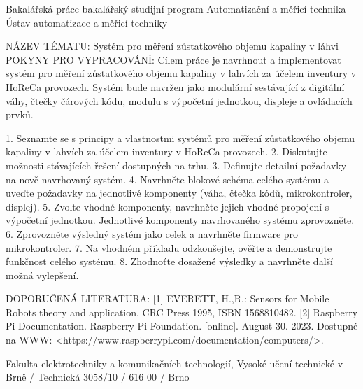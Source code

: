 Bakalářská práce
bakalářský studijní program Automatizační a měřicí technika
Ústav automatizace a měřicí techniky

NÁZEV TÉMATU:
Systém pro měření zůstatkového objemu kapaliny v láhvi
POKYNY PRO VYPRACOVÁNÍ:
Cílem práce je navrhnout a implementovat systém pro měření zůstatkového objemu kapaliny v lahvích za účelem
inventury v HoReCa provozech. Systém bude navržen jako modulární sestávající z digitální váhy, čtečky
čárových kódu, modulu s výpočetní jednotkou, displeje a ovládacích prvků.

1. Seznamte se s principy a vlastnostmi systémů pro měření zůstatkového objemu kapaliny v lahvích za účelem
inventury v HoReCa provozech.
2. Diskutujte možnosti stávajících řešení dostupných na trhu.
3. Definujte detailní požadavky na nově navrhovaný systém.
4. Navrhněte blokové schéma celého systému a uveďte požadavky na jednotlivé komponenty (váha, čtečka
kódů, mikrokontroler, displej).
5. Zvolte vhodné komponenty, navrhněte jejich vhodné propojení s výpočetní jednotkou. Jednotlivé komponenty
navrhovaného systému zprovozněte.
6. Zprovozněte výsledný systém jako celek a navrhněte firmware pro mikrokontroler.
7. Na vhodném příkladu odzkoušejte, ověřte a demonstrujte funkčnost celého systému.
8. Zhodnoťte dosažené výsledky a navrhněte další možná vylepšení.

DOPORUČENÁ LITERATURA:
[1] EVERETT, H.,R.: Sensors for Mobile Robots theory and application, CRC Press 1995, ISBN 1568810482.
[2] Raspberry Pi Documentation. Raspberry Pi Foundation. [online]. August 30. 2023. Dostupné na WWW:
<https://www.raspberrypi.com/documentation/computers/>.

Fakulta elektrotechniky a komunikačních technologií, Vysoké učení technické v Brně / Technická 3058/10 / 616 00 / Brno